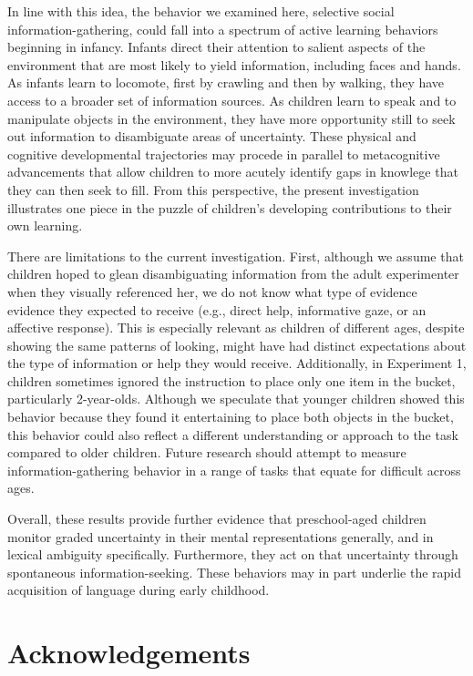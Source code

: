 \documentclass[english,man]{apa6}
\theoremstyle{definition}
\theoremstyle{definition}
\theoremstyle{definition}
\theoremstyle{remark}
\begin{document}
In line with this idea, the behavior we examined here, selective social
information-gathering, could fall into a spectrum of active learning
behaviors beginning in infancy. Infants direct their attention to
salient aspects of the environment that are most likely to yield
information, including faces and hands. As infants learn to locomote,
first by crawling and then by walking, they have access to a broader set
of information sources. As children learn to speak and to manipulate
objects in the environment, they have more opportunity still to seek out
information to disambiguate areas of uncertainty. These physical and
cognitive developmental trajectories may procede in parallel to
metacognitive advancements that allow children to more acutely identify
gaps in knowlege that they can then seek to fill. From this perspective,
the present investigation illustrates one piece in the puzzle of
children's developing contributions to their own learning.

There are limitations to the current investigation. First, although we
assume that children hoped to glean disambiguating information from the
adult experimenter when they visually referenced her, we do not know
what type of evidence evidence they expected to receive (e.g., direct
help, informative gaze, or an affective response). This is especially
relevant as children of different ages, despite showing the same
patterns of looking, might have had distinct expectations about the type
of information or help they would receive. Additionally, in Experiment
1, children sometimes ignored the instruction to place only one item in
the bucket, particularly 2-year-olds. Although we speculate that younger
children showed this behavior because they found it entertaining to
place both objects in the bucket, this behavior could also reflect a
different understanding or approach to the task compared to older
children. Future research should attempt to measure
information-gathering behavior in a range of tasks that equate for
difficult across ages.

Overall, these results provide further evidence that preschool-aged
children monitor graded uncertainty in their mental representations
generally, and in lexical ambiguity specifically. Furthermore, they act
on that uncertainty through spontaneous information-seeking. These
behaviors may in part underlie the rapid acquisition of language during
early childhood.

\section{Acknowledgements}\label{acknowledgements}
\end{document}
